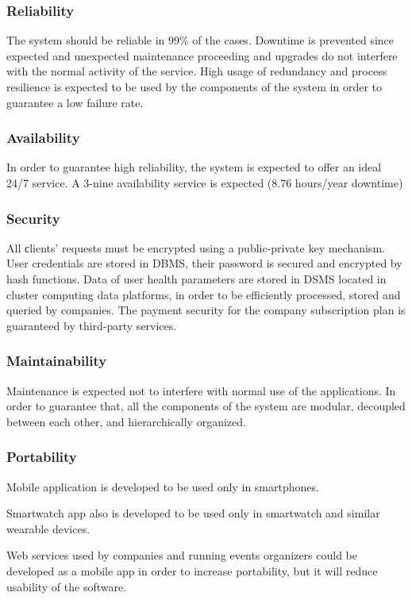 \subsubsection{Reliability}
The system should be reliable in 99\% of the cases. Downtime is prevented since expected and unexpected maintenance proceeding and upgrades do not interfere with the normal activity of the service.
High usage of redundancy and process resilience is expected to be used by the components of the system in order to guarantee a low failure rate.

\subsubsection{Availability}
In order to guarantee  high reliability, the system is expected to offer an ideal 24/7 service. A 3-nine availability service is expected (8.76 hours/year downtime)

\subsubsection{Security}
All сlients' requests must be encrypted using a public-private key mechanism.
User credentials are stored in DBMS, their password is secured and encrypted by hash functions.
Data of user health parameters are stored in DSMS located in cluster computing data platforms, in order to be efficiently processed, stored and queried by companies.
The payment security for the company subscription plan is guaranteed by third-party services. 
\subsubsection{Maintainability}
Maintenance is expected not to interfere with normal use of the applications. In order to guarantee that, all the components of the system are modular, decoupled between each other, and hierarchically organized.
\subsubsection{Portability}
Mobile application is developed to be used only in smartphones.

Smartwatch app also is developed to be used only in smartwatch and similar wearable devices.

Web services used by companies and running events organizers could be developed as a mobile app in order to increase portability, but it will reduce usability of the software. 
